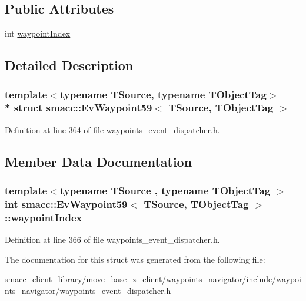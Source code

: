 \subsection*{Public Attributes}
\begin{DoxyCompactItemize}
\item 
int \hyperlink{structsmacc_1_1EvWaypoint59_af2ef89751d9deab5efb802473da95446}{waypoint\+Index}
\end{DoxyCompactItemize}


\subsection{Detailed Description}
\subsubsection*{template$<$typename T\+Source, typename T\+Object\+Tag$>$\\*
struct smacc\+::\+Ev\+Waypoint59$<$ T\+Source, T\+Object\+Tag $>$}



Definition at line 364 of file waypoints\+\_\+event\+\_\+dispatcher.\+h.



\subsection{Member Data Documentation}
\subsubsection[{\texorpdfstring{waypoint\+Index}{waypointIndex}}]{\setlength{\rightskip}{0pt plus 5cm}template$<$typename T\+Source , typename T\+Object\+Tag $>$ int {\bf smacc\+::\+Ev\+Waypoint59}$<$ T\+Source, T\+Object\+Tag $>$\+::waypoint\+Index}\hypertarget{structsmacc_1_1EvWaypoint59_af2ef89751d9deab5efb802473da95446}{}\label{structsmacc_1_1EvWaypoint59_af2ef89751d9deab5efb802473da95446}


Definition at line 366 of file waypoints\+\_\+event\+\_\+dispatcher.\+h.



The documentation for this struct was generated from the following file\+:\begin{DoxyCompactItemize}
\item 
smacc\+\_\+client\+\_\+library/move\+\_\+base\+\_\+z\+\_\+client/waypoints\+\_\+navigator/include/waypoints\+\_\+navigator/\hyperlink{waypoints__event__dispatcher_8h}{waypoints\+\_\+event\+\_\+dispatcher.\+h}\end{DoxyCompactItemize}

